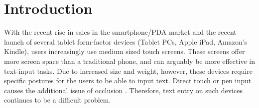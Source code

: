 \section{Introduction}

With the recent rise in sales in the smartphone/PDA market
and the recent launch of several tablet form-factor devices (Tablet PCs, Apple iPad, Amazon's Kindle), users increasingly use medium sized touch screens. These screens offer
more screen space than a traditional phone, and can arguably be more
effective in text-input tasks. Due to increased size and weight,
however, these devices require specific postures for the users to be
able to input text. Direct touch or pen input causes the additional issue of occlusion . Therefore, text entry on such devices continues to be a difficult problem.

